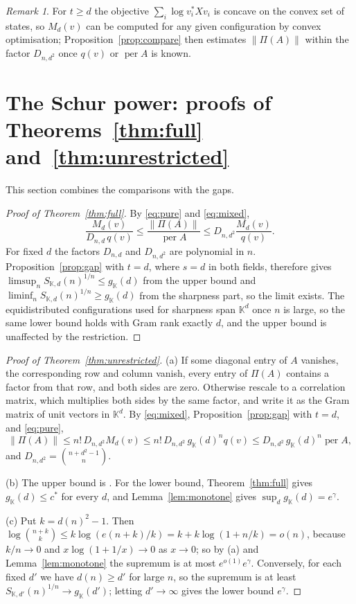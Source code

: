 \documentclass[11pt,a4paper]{article}
\theoremstyle{remark}
\newtheorem{remark}[theorem]{Remark}
\newcommand{\per}{\operatorname{per}}
\newcommand{\norm}[1]{\left\lVert#1\right\rVert}
\newcommand{\K}{\mathbb K}
\begin{document}
\begin{remark}
For $t\ge d$ the objective $\sum_i\log v_i^*Xv_i$ is concave on the convex set of states, so $M_d(v)$ can be computed for any given configuration by convex optimisation; Proposition~\ref{prop:compare} then estimates $\norm{\Pi(A)}$ within the factor $D_{n,d^2}$ once $q(v)$ or $\per A$ is known.
\end{remark}

\section{The Schur power: proofs of Theorems~\ref{thm:full} and~\ref{thm:unrestricted}}\label{sec:schur}
This section combines the comparisons with the gaps.

\begin{proof}[Proof of Theorem~\ref{thm:full}]
By \eqref{eq:pure} and \eqref{eq:mixed},
\[
 \frac{M_d(v)}{D_{n,d}\,q(v)}\le\frac{\norm{\Pi(A)}}{\per A}\le D_{n,d^2}\frac{M_d(v)}{q(v)} .
\]
For fixed $d$ the factors $D_{n,d}$ and $D_{n,d^2}$ are polynomial in $n$. Proposition~\ref{prop:gap} with $t=d$, where $s=d$ in both fields, therefore gives $\limsup_nS_{\K,d}(n)^{1/n}\le g_\K(d)$ from the upper bound and $\liminf_nS_{\K,d}(n)^{1/n}\ge g_\K(d)$ from the sharpness part, so the limit exists. The equidistributed configurations used for sharpness span $\K^d$ once $n$ is large, so the same lower bound holds with Gram rank exactly $d$, and the upper bound is unaffected by the restriction.
\end{proof}

\begin{proof}[Proof of Theorem~\ref{thm:unrestricted}]
(a) If some diagonal entry of $A$ vanishes, the corresponding row and column vanish, every entry of $\Pi(A)$ contains a factor from that row, and both sides are zero. Otherwise rescale to a correlation matrix, which multiplies both sides by the same factor, and write it as the Gram matrix of unit vectors in $\K^d$. By \eqref{eq:mixed}, Proposition~\ref{prop:gap} with $t=d$, and \eqref{eq:pure},
\[
 \norm{\Pi(A)}\le n!\,D_{n,d^2}M_d(v)\le n!\,D_{n,d^2}\,g_\K(d)^nq(v)\le D_{n,d^2}\,g_\K(d)^n\per A,
\]
and $D_{n,d^2}=\binom{n+d^2-1}{n}$.

(b) The upper bound is \cite[Theorem~2]{AGGS}. For the lower bound, Theorem~\ref{thm:full} gives $g_\K(d)\le c^*$ for every $d$, and Lemma~\ref{lem:monotone} gives $\sup_dg_\K(d)=e^\gamma$.

(c) Put $k=d(n)^2-1$. Then $\log\binom{n+k}{k}\le k\log(e(n+k)/k)=k+k\log(1+n/k)=o(n)$, because $k/n\to0$ and $x\log(1+1/x)\to0$ as $x\to0$; so by (a) and Lemma~\ref{lem:monotone} the supremum is at most $e^{o(1)}e^\gamma$. Conversely, for each fixed $d'$ we have $d(n)\ge d'$ for large $n$, so the supremum is at least $S_{\K,d'}(n)^{1/n}\to g_\K(d')$; letting $d'\to\infty$ gives the lower bound $e^\gamma$.
\end{proof}
\end{document}
